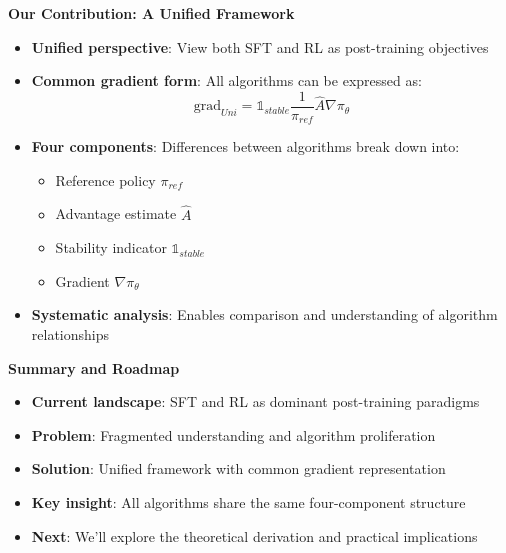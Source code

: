 \begin{frame}
\begin{center}
\Large \textbf{Our Contribution: A Unified Framework}
\end{center}

\vspace{0.5cm}

\begin{itemize}
    \item \textbf{Unified perspective}: View both SFT and RL as post-training objectives
    
    \item \textbf{Common gradient form}: All algorithms can be expressed as:
    $$\text{grad}_{Uni} = \mathbb{1}_{stable} \frac{1}{\pi_{ref}} \hat{A} \nabla \pi_{\theta}$$
    
    \item \textbf{Four components}: Differences between algorithms break down into:
    \begin{itemize}
        \item Reference policy $\pi_{ref}$
        \item Advantage estimate $\hat{A}$
        \item Stability indicator $\mathbb{1}_{stable}$
        \item Gradient $\nabla \pi_{\theta}$
    \end{itemize}
    
    \item \textbf{Systematic analysis}: Enables comparison and understanding of algorithm relationships
\end{itemize}
\end{frame}%
\begin{frame}
\begin{center}
\Large \textbf{Summary and Roadmap}
\end{center}

\vspace{0.5cm}

\begin{itemize}
    \item \textbf{Current landscape}: SFT and RL as dominant post-training paradigms
    
    \item \textbf{Problem}: Fragmented understanding and algorithm proliferation
    
    \item \textbf{Solution}: Unified framework with common gradient representation
    
    \item \textbf{Key insight}: All algorithms share the same four-component structure
    
    \item \textbf{Next}: We'll explore the theoretical derivation and practical implications
\end{itemize}
\end{frame}%
